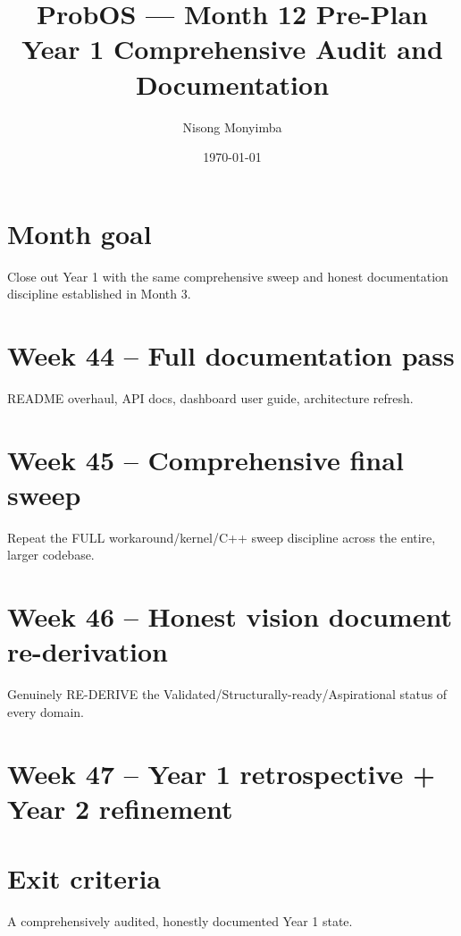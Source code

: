 \documentclass[11pt]{article}
\title{ProbOS --- Month 12 Pre-Plan\\Year 1 Comprehensive Audit and Documentation}
\author{Nisong Monyimba}
\date{\today}
\begin{document}
\maketitle

\section*{Month goal}
Close out Year 1 with the same comprehensive sweep and honest
documentation discipline established in Month 3.

\section*{Week 44 -- Full documentation pass}
README overhaul, API docs, dashboard user guide, architecture refresh.

\section*{Week 45 -- Comprehensive final sweep}
Repeat the FULL workaround/kernel/C++ sweep discipline across the
entire, larger codebase.

\section*{Week 46 -- Honest vision document re-derivation}
Genuinely RE-DERIVE the Validated/Structurally-ready/Aspirational
status of every domain.

\section*{Week 47 -- Year 1 retrospective + Year 2 refinement}

\section*{Exit criteria}
A comprehensively audited, honestly documented Year 1 state.
\end{document}
